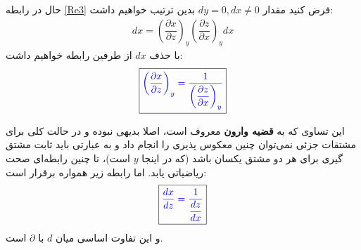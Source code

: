 \documentclass[12pt,a4paper]{article}							   %
\begin{document}
حال در رابطه
\eqref{Re3}
فرض کنید مقدار
$ dy=0 , dx\neq 0 $
بدین ترتیب خواهیم داشت:
\begin{align*}
dx=\left(\dfrac{\partial x}{\partial z}\right)_{y}\left(\dfrac{\partial z}{\partial x}\right)_{y}dx
\end{align*}
با حذف
$ dx$
از طرفین رابطه خواهیم داشت:
\begin{align}\label{Re4}
\boxed{\textcolor{blue}{\left(\dfrac{\partial x}{\partial z}\right)_{y}=\dfrac{1}{\left(\dfrac{\partial z}{\partial x}\right)_{y}}}}
\end{align}
\par
این تساوی که به
\textbf{قضیه وارون}
 معروف است، اصلا بدیهی نبوده و در حالت کلی برای مشتقات جزئی نمی‌توان چنین معکوس پذیری را انجام داد و به عبارتی باید ثابت مشتق گیری برای هر دو مشتق یکسان باشد (که در اینجا
$ y $
است)، تا چنین رابطه‌ای صحت ریاضیاتی یابد. اما رابطه زیر همواره برقرار است:
\begin{align}
\boxed{\textcolor{blue}{\dfrac{dx}{dz}=\dfrac{1}{\dfrac{dz}{dx}}}}
\end{align}
و این تفاوت اساسی میان
$ d $
با
$\partial  $
است.
\end{document}
